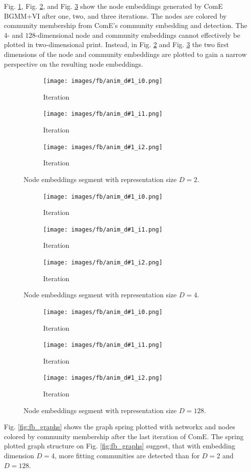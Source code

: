 \documentclass[conference]{IEEEtran}
\begin{document}
Fig. \ref{fig:fb_emb_anim_d2}, Fig. \ref{fig:fb_emb_anim_d4}, and Fig. \ref{fig:fb_emb_anim_d128} show the node embeddings generated by ComE BGMM+VI after one, two, and three iterations. The nodes are colored by community membership from ComE's community embedding and detection.
The $4$- and $128$-dimensional node and community embeddings cannot effectively be plotted in two-dimensional print. Instead, in Fig. \ref{fig:fb_emb_anim_d4} and Fig. \ref{fig:fb_emb_anim_d128} the two first dimensions of the node and community embeddings are plotted to gain a narrow perspective on the resulting node embeddings.

\newcommand{\fbEmbAnimD}[1]{
    \begin{figure}[htbp]
        \centering
        \begin{subfigure}{.33\textwidth}
            \centering
            \texttt{[image: images/fb/anim\_d\#1\_i0.png]}
            \caption{\nth{1} Iteration}
        \end{subfigure}%
        \begin{subfigure}{.33\textwidth}
            \centering
            \texttt{[image: images/fb/anim\_d\#1\_i1.png]}
            \caption{\nth{2} Iteration}
        \end{subfigure}%
        \begin{subfigure}{.33\textwidth}
            \centering
            \texttt{[image: images/fb/anim\_d\#1\_i2.png]}
            \caption{\nth{3} Iteration}
        \end{subfigure}%
        \caption{Node embeddings segment with representation size $D=#1$.}
        \label{fig:fb_emb_anim_d#1}
    \end{figure}
}

\fbEmbAnimD{2}
\fbEmbAnimD{4}
\fbEmbAnimD{128}

Fig. \ref{fig:fb_graphs} shows the graph spring plotted with networkx and nodes colored by community membership after the last iteration of ComE.\cite{networkx} The spring plotted graph structure on Fig. \ref{fig:fb_graphs} suggest, that with embedding dimension $D=4$, more fitting communities are detected than for $D=2$ and $D=128$.
\end{document}
